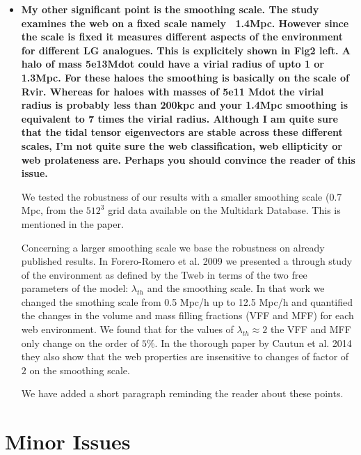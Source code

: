 \documentclass{article}
\begin{document}
\begin{itemize}
\item
{\bf My other significant point is the smoothing scale. The study
  examines the web on a fixed scale namely ~1.4Mpc. However since the
  scale is fixed it measures different aspects of the environment for
  different LG analogues. This is explicitely shown in Fig2 left. A
  halo of mass 5e13Mdot could have a virial radius of upto 1 or
  1.3Mpc. For these haloes the smoothing is basically on the scale of
  Rvir. Whereas for haloes with masses of 5e11 Mdot the virial radius
  is probably less than 200kpc and your 1.4Mpc smoothing is equivalent
  to 7 times the virial radius.  Although I am quite sure that the
  tidal tensor eigenvectors are stable across these different scales,
  I'm not quite sure the web classification, web ellipticity or web
  prolateness are. Perhaps you should convince the reader of this
  issue.} 


We tested the robustness of our results with a smaller smoothing scale
(0.7 Mpc, from the $512^3$ grid data available on the Multidark
Database. This is mentioned in the paper. 

Concerning a larger smoothing scale we base the robustness on already
published results. In Forero-Romero et al. 2009  we presented a
through study of the environment as defined by the Tweb in terms of
the two free parameters of the model: $\lambda_{th}$ and the smoothing
scale. In that work we changed the smothing scale from 0.5 Mpc/h up to
12.5 Mpc/h and quantified the changes in the volume and mass filling
fractions (VFF and MFF) for each web environment. We found that for
the values of $\lambda_{th}\approx 2$ the VFF and MFF only change on
the order of $5\%$. In the thorough paper by Cautun et al. 2014 they
also show that the web properties are insensitive to changes of factor
of $2$ on the smoothing scale. 

We have added a short paragraph reminding the reader about these points. 
\end{itemize}

\section{Minor Issues}
\end{document}
